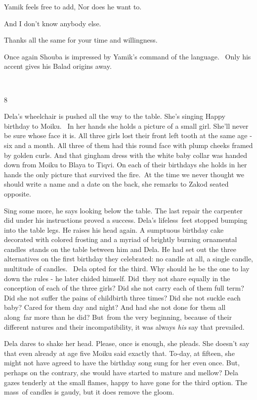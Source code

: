 \documentclass[letterpaper]{article}
\begin{document}
Yamik feels free to add, {\textquotedbl}Nor does he want to.{\textquotedbl}\ 

{\textquotedbl}And I don't know anybody else.{\textquotedbl} 

{\textquotedbl}Thanks all the same for your time and willingness.{\textquotedbl}

Once again Shouba is impressed by Yamik's command of the language. \ Only his accent gives his Balad origins away.

~

8 

Dela's wheelchair is pushed all the way to the table. She's singing {\textquotedbl}Happy birthday to
Moiku{\textquotedbl}. ~In her hands she holds a picture of a small girl. She'll never be sure whose face it is. All
three girls lost their front left tooth at the same age - six and a month. All three of them had this round face with
plump cheeks framed by golden curls. And that gingham dress with the white baby collar was handed down from Moiku to
Blaya to Tiqvi. On each of their birthdays she holds in her hands the only picture that survived the
fire.\ {\textquotedbl}At the time we never thought we should write a name and a date on the back,{\textquotedbl} she
remarks to Zakod seated opposite.

{\textquotedbl}Sing some more,{\textquotedbl} he says looking below the table. The last repair the carpenter did under
his instructions proved a success. Dela's lifeless\ feet stopped bumping into the table legs. He raises his head again.
A sumptuous birthday cake decorated with colored frosting and a myriad of brightly burning ornamental candles~stands on
the table between him and Dela. He had set out the three alternatives on the first birthday they celebrated: no candle
at all, a single candle, multitude of candles.~ Dela opted for the third. Why should he be the one to lay down the
rules - he later chided himself. Did~they not share equally in the conception of each of the three girls? Did she not
carry each of them full term? Did she not suffer the pains of childbirth three times? Did she not suckle each baby?
Cared for them day and night? And had she not done for them all along\ far more than he did? But\ from the very
beginning, because of their different natures and their incompatibility, it was always \textit{his} say that
prevailed.\ 

Dela dares to shake her head. {\textquotedbl}Please, once is enough,{\textquotedbl} she pleads. She doesn't say that
even already at age five Moiku said exactly that. To-day, at fifteen, she might not have agreed to have the birthday
song sung for her even once. But, perhaps on the contrary, she would have started to mature and mellow? Dela gazes
tenderly at the small flames, happy to have gone for the third option. The mass\ of candles is gaudy, but it does
remove the gloom.\ 
\end{document}
